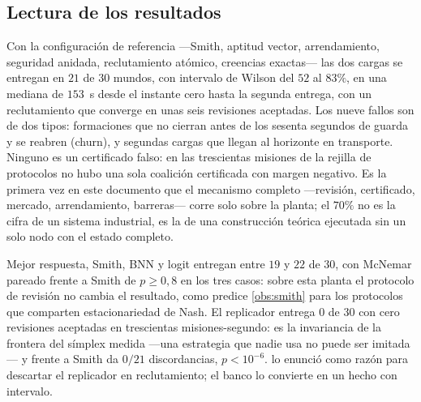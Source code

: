 \subsection{Lectura de los resultados}

\begin{observacion}
\label{obs:ensayo-cierre-tasa}
Con la configuración de referencia —Smith, aptitud vector, arrendamiento,
seguridad anidada, reclutamiento atómico, creencias exactas— las dos cargas se
entregan en $21$ de $30$ mundos, con intervalo de Wilson del $52$ al $83\%$, en
una mediana de $153$~s desde el instante cero hasta la segunda entrega, con un
reclutamiento que converge en unas seis revisiones aceptadas. Los nueve fallos
son de dos tipos: formaciones que no cierran antes de los sesenta segundos de
guarda y se reabren (churn), y segundas cargas que llegan al horizonte en
transporte. Ninguno es un certificado falso: en las trescientas misiones de la
rejilla de protocolos no hubo una sola coalición certificada con margen negativo.
Es la primera vez en este documento que el mecanismo completo —revisión,
certificado, mercado, arrendamiento, barreras— corre solo sobre la planta; el
$70\%$ no es la cifra de un sistema industrial, es la de una construcción
teórica ejecutada sin un solo nodo con el estado completo.
\end{observacion}

\begin{observacion}
\label{obs:ensayo-cierre-protocolos}
Mejor respuesta, Smith, BNN y logit entregan entre $19$ y $22$ de $30$, con
McNemar pareado frente a Smith de $p\ge0{,}8$ en los tres casos: sobre esta
planta el protocolo de revisión no cambia el resultado, como predice
\cref{obs:smith} para los protocolos que comparten estacionariedad de Nash. El
replicador entrega $0$ de $30$ con cero revisiones aceptadas en trescientas
misiones-segundo: es la invariancia de la frontera del símplex medida —una
estrategia que nadie usa no puede ser imitada— y frente a Smith da $0/21$
discordancias, $p<10^{-6}$.  lo enunció como razón para
descartar el replicador en reclutamiento; el banco lo convierte en un hecho
con intervalo.
\end{observacion}

